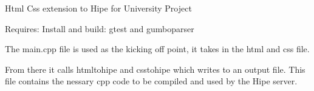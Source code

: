 Html Css extension to Hipe for University Project

Requires\+: Install and build\+: gtest and gumboparser

The main.\+cpp file is used as the kicking off point, it takes in the html and css file.

From there it calls htmltohipe and csstohipe which writes to an output file. This file contains the nessary cpp code to be compiled and used by the Hipe server. 